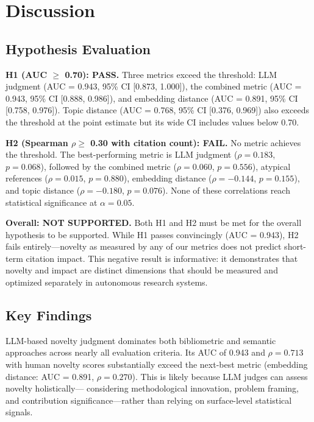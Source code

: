 \documentclass[11pt,a4paper]{article}
\begin{document}
\section{Discussion}
\label{sec:discussion}

\subsection{Hypothesis Evaluation}

\textbf{H1 (AUC $\geq$ 0.70): PASS.}  Three metrics exceed the threshold:
LLM judgment (AUC = 0.943, 95\% CI [0.873, 1.000]), the combined metric
(AUC = 0.943, 95\% CI [0.888, 0.986]), and embedding distance
(AUC = 0.891, 95\% CI [0.758, 0.976]).  Topic distance
(AUC = 0.768, 95\% CI [0.376, 0.969]) also exceeds the threshold at the
point estimate but its wide CI includes values below 0.70.

\textbf{H2 (Spearman $\rho \geq$ 0.30 with citation count): FAIL.}  No
metric achieves the threshold.  The best-performing metric is LLM
judgment ($\rho = 0.183$, $p = 0.068$), followed by the combined metric
($\rho = 0.060$, $p = 0.556$), atypical references ($\rho = 0.015$,
$p = 0.880$), embedding distance ($\rho = -0.144$, $p = 0.155$), and
topic distance ($\rho = -0.180$, $p = 0.076$).  None of these
correlations reach statistical significance at $\alpha = 0.05$.

\textbf{Overall: NOT SUPPORTED.}  Both H1 and H2 must be met for the
overall hypothesis to be supported.  While H1 passes convincingly
(AUC = 0.943), H2 fails entirely---novelty as measured by any of our
metrics does not predict short-term citation impact.  This negative
result is informative: it demonstrates that novelty and impact are
distinct dimensions that should be measured and optimized separately in
autonomous research systems.

\subsection{Key Findings}

LLM-based novelty judgment dominates both bibliometric and semantic
approaches across nearly all evaluation criteria.  Its AUC of 0.943
and $\rho = 0.713$ with human novelty scores substantially exceed the
next-best metric (embedding distance: AUC = 0.891, $\rho = 0.270$).
This is likely because LLM judges can assess novelty holistically---
considering methodological innovation, problem framing, and
contribution significance---rather than relying on surface-level
statistical signals.
\end{document}
